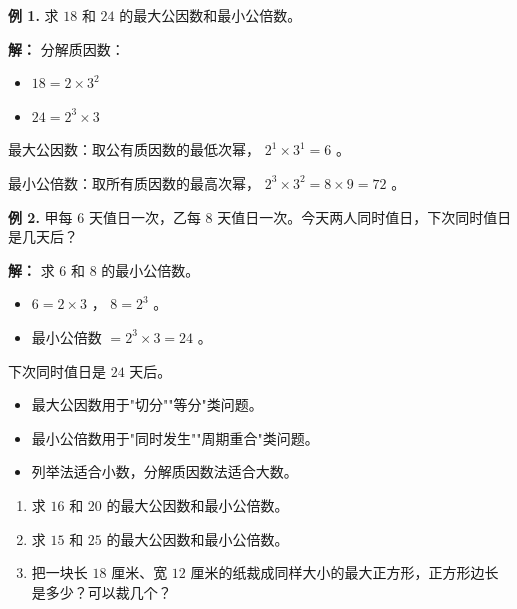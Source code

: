 \begin{workedexamples}


\textbf{例 1.} 求 $18$ 和 $24$ 的最大公因数和最小公倍数。

\textbf{解：} 分解质因数：
\begin{itemize}
  \item $18 = 2 \times 3^2$
  \item $24 = 2^3 \times 3$
\end{itemize}


最大公因数：取公有质因数的最低次幂， $2^1 \times 3^1 = 6$ 。

最小公倍数：取所有质因数的最高次幂， $2^3 \times 3^2 = 8 \times 9 = 72$ 。

\textbf{例 2.} 甲每 $6$ 天值日一次，乙每 $8$ 天值日一次。今天两人同时值日，下次同时值日是几天后？

\textbf{解：} 求 $6$ 和 $8$ 的最小公倍数。
\begin{itemize}
  \item $6 = 2 \times 3$ ， $8 = 2^3$ 。
  \item 最小公倍数 $= 2^3 \times 3 = 24$ 。
\end{itemize}


下次同时值日是 $24$ 天后。

\end{workedexamples}

\begin{keytakeaway}


\begin{itemize}
  \item 最大公因数用于"切分""等分"类问题。
  \item 最小公倍数用于"同时发生""周期重合"类问题。
  \item 列举法适合小数，分解质因数法适合大数。
\end{itemize}


\end{keytakeaway}

\begin{practice}


\begin{enumerate}
  \item 求 $16$ 和 $20$ 的最大公因数和最小公倍数。
  \item 求 $15$ 和 $25$ 的最大公因数和最小公倍数。
  \item 把一块长 $18$ 厘米、宽 $12$ 厘米的纸裁成同样大小的最大正方形，正方形边长是多少？可以裁几个？
\end{enumerate}


\end{practice}



